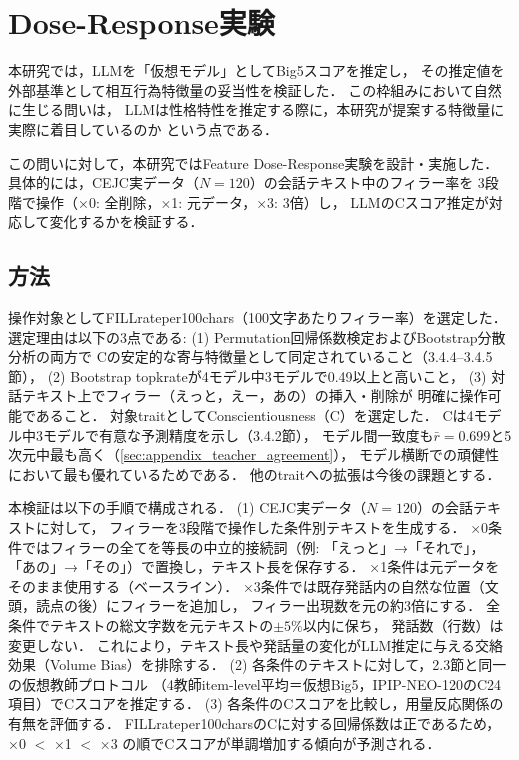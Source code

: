 \documentclass[dvipdfmx,11pt,a4paper]{bxjsarticle}
\renewcommand{\_}{\paperorigunderscore\allowbreak}%
\begin{document}
\section{Dose-Response実験}

本研究では，LLMを「仮想モデル」としてBig5スコアを推定し，
その推定値を外部基準として相互行為特徴量の妥当性を検証した．
この枠組みにおいて自然に生じる問いは，
LLMは性格特性を推定する際に，本研究が提案する特徴量に実際に着目しているのか
という点である．

この問いに対して，本研究ではFeature Dose-Response実験を設計・実施した．
具体的には，CEJC実データ（$N = 120$）の会話テキスト中のフィラー率を
3段階で操作（×0: 全削除，×1: 元データ，×3: 3倍）し，
LLMのCスコア推定が対応して変化するかを検証する．


\subsection{方法}
操作対象としてFILL\_rate\_per\_100chars（100文字あたりフィラー率）を選定した．
選定理由は以下の3点である:
(1) Permutation回帰係数検定およびBootstrap分散分析の両方で
Cの安定的な寄与特徴量として同定されていること（3.4.4--3.4.5節），
(2) Bootstrap topk\_rateが4モデル中3モデルで0.49以上と高いこと，
(3) 対話テキスト上でフィラー（えっと，えー，あの）の挿入・削除が
明確に操作可能であること．
対象traitとしてConscientiousness（C）を選定した．
Cは4モデル中3モデルで有意な予測精度を示し（3.4.2節），
モデル間一致度も$\bar{r} = 0.699$と5次元中最も高く（\ref{sec:appendix_teacher_agreement}），
モデル横断での頑健性において最も優れているためである．
他のtraitへの拡張は今後の課題とする．


本検証は以下の手順で構成される．
(1) CEJC実データ（$N = 120$）の会話テキストに対して，
フィラーを3段階で操作した条件別テキストを生成する．
×0条件ではフィラーの全てを等長の中立的接続詞（例: 「えっと」→「それで」，
「あの」→「その」）で置換し，テキスト長を保存する．
×1条件は元データをそのまま使用する（ベースライン）．
×3条件では既存発話内の自然な位置（文頭，読点の後）にフィラーを追加し，
フィラー出現数を元の約3倍にする．
全条件でテキストの総文字数を元テキストの$\pm 5\%$以内に保ち，
発話数（行数）は変更しない．
これにより，テキスト長や発話量の変化がLLM推定に与える交絡効果（Volume Bias）を排除する．
(2) 各条件のテキストに対して，2.3節と同一の仮想教師プロトコル
（4教師item-level平均＝仮想Big5，IPIP-NEO-120のC24項目）でCスコアを推定する．
(3) 各条件のCスコアを比較し，用量反応関係の有無を評価する．
FILL\_rate\_per\_100charsのCに対する回帰係数は正であるため，
×0 $<$ ×1 $<$ ×3 の順でCスコアが単調増加する傾向が予測される．
\end{document}
